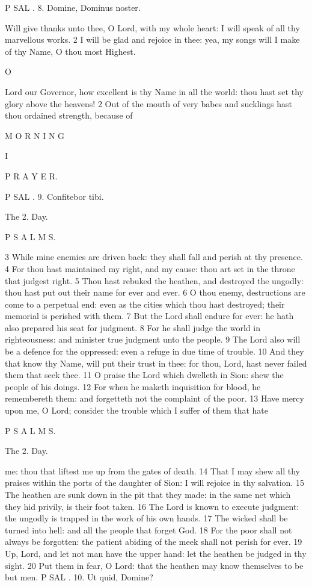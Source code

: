 P SAL . 8. Domine, Dominus noster.

Will give thanks unto thee, O Lord, with my whole heart: I will speak of all thy marvellous works. 2 I will be glad and rejoice in thee: yea, my songs will I make of thy Name, O thou most Highest.

O

Lord our Governor, how excellent is thy Name in all the world: thou hast set thy glory above the heavens! 2 Out of the mouth of very babes and sucklings hast thou ordained strength, because of

M O R N I N G

I

P R A Y E R.

P SAL . 9. Confitebor tibi.

The 2. Day.

P S A L M S.

3 While mine enemies are driven back: they shall fall and perish at thy presence. 4 For thou hast maintained my right, and my cause: thou art set in the throne that judgest right. 5 Thou hast rebuked the heathen, and destroyed the ungodly: thou hast put out their name for ever and ever. 6 O thou enemy, destructions are come to a perpetual end: even as the cities which thou hast destroyed; their memorial is perished with them. 7 But the Lord shall endure for ever: he hath also prepared his seat for judgment. 8 For he shall judge the world in righteousness: and minister true judgment unto the people. 9 The Lord also will be a defence for the oppressed: even a refuge in due time of trouble. 10 And they that know thy Name, will put their trust in thee: for thou, Lord, hast never failed them that seek thee. 11 O praise the Lord which dwelleth in Sion: shew the people of his doings. 12 For when he maketh inquisition for blood, he remembereth them: and forgetteth not the complaint of the poor. 13 Have mercy upon me, O Lord; consider the trouble which I suffer of them that hate

P S A L M S.

The 2. Day.

me: thou that liftest me up from the gates of death. 14 That I may shew all thy praises within the ports of the daughter of Sion: I will rejoice in thy salvation. 15 The heathen are sunk down in the pit that they made: in the same net which they hid privily, is their foot taken. 16 The Lord is known to execute judgment: the ungodly is trapped in the work of his own hands. 17 The wicked shall be turned into hell: and all the people that forget God. 18 For the poor shall not always be forgotten: the patient abiding of the meek shall not perish for ever. 19 Up, Lord, and let not man have the upper hand: let the heathen be judged in thy sight. 20 Put them in fear, O Lord: that the heathen may know themselves to be but men. P SAL . 10. Ut quid, Domine?

